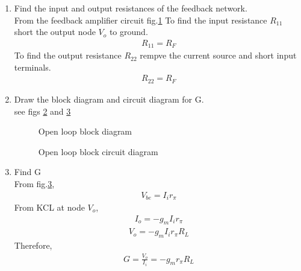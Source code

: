 \begin{enumerate}[label=\arabic*.,ref=\theenumi]
%
%
\begin{figure}[ht!]
	\begin{center}
		\resizebox{\columnwidth}{!}{}
	\end{center}
	\caption{Feedback circuit}
	\label{fig:ee18btech11046_fc}
\end{figure}
\renewcommand{\thefigure}{\theenumi}
%

From KVl on \ref{fig:ee18btech11046_fc} we can see that
\begin{align}
H=\frac{I_{F}}{V_{o}} = -\frac{1}{R_{F}}
\end{align}

\item Find the input and output resistances of the feedback network.\\
\solution
From the feedback amplifier circuit fig.\ref{fig:ee18btech11046_fc}
To find the input resistance $R_{11}$ short
the output node $V_{o}$ to ground.
\begin{align}
R_{11} = R_{F}
\end{align}
To find the output resistance $R_{22}$ rempve the current source and short input terminals.
\begin{align}
R_{22} = R_{F}
\end{align}

\item Draw the block diagram and circuit diagram for G.
\\
\solution see figs \ref{fig:ee18btech11046_Gblock} and \ref{fig:ee18btech11046_Gcir}
%
\renewcommand{\thefigure}{\theenumi.\arabic{figure}}

\begin{figure}[ht!]
	\begin{center}
		\resizebox{\columnwidth}{!}{}
	\end{center}
	\caption{Open loop block diagram}
	\label{fig:ee18btech11046_Gblock}
\end{figure}

%
\begin{figure}[ht!]
	\begin{center}
		\resizebox{\columnwidth}{!}{}
	\end{center}
	\caption{Open loop block circuit diagram}
	\label{fig:ee18btech11046_Gcir}
\end{figure}

\item Find G
\\
\solution
From fig.\ref{fig:ee18btech11046_Gcir},
\begin{align}
V_{be} = I_{i}r_{\pi}
\end{align}
From KCL at node $V_{o}$,
\begin{align}
I_{o} = -g_{m}I_{i}r_{\pi}
\end{align}
\begin{align}
V_{o} = -g_{m}I_{i}r_{\pi}R_{L}
\end{align}
Therefore,
\begin{align}
G =\frac{V_{o}}{I_{i}} = -g_{m}r_{\pi}R_{L}
\end{align}


\end{enumerate}
